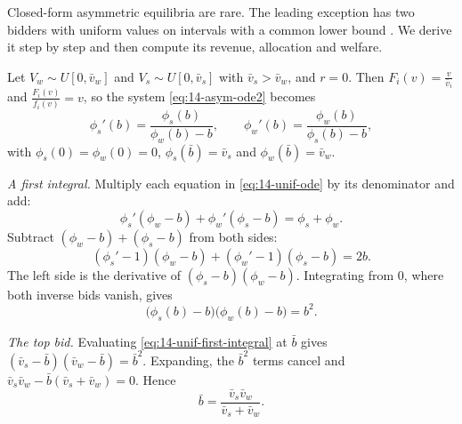Closed-form asymmetric equilibria are rare. The leading exception has two bidders with uniform values
on intervals with a common lower bound
\citep{GriesmerLevitanShubik1967,Plum1992,Krishna2010}. We derive it step by step and then compute
its revenue, allocation and welfare.

\begin{example}\label{ex:14-asym-uniform}
Let $V_w\sim U[0,\bar v_w]$ and $V_s\sim U[0,\bar v_s]$ with $\bar v_s>\bar v_w$, and $r=0$. Then
$F_i(v)=\frac{v}{\bar v_i}$ and $\frac{F_i(v)}{f_i(v)}=v$, so the system \eqref{eq:14-asym-ode2}
becomes
\begin{equation}\label{eq:14-unif-ode}
\phi_s'(b)=\frac{\phi_s(b)}{\phi_w(b)-b},\qquad \phi_w'(b)=\frac{\phi_w(b)}{\phi_s(b)-b},
\end{equation}
with $\phi_s(0)=\phi_w(0)=0$, $\phi_s(\bar b)=\bar v_s$ and $\phi_w(\bar b)=\bar v_w$.

\emph{A first integral.} Multiply each equation in \eqref{eq:14-unif-ode} by its denominator and add:
\[
\phi_s'(\phi_w-b)+\phi_w'(\phi_s-b)=\phi_s+\phi_w .
\]
Subtract $(\phi_w-b)+(\phi_s-b)$ from both sides:
\[
(\phi_s'-1)(\phi_w-b)+(\phi_w'-1)(\phi_s-b)=2b .
\]
The left side is the derivative of $(\phi_s-b)(\phi_w-b)$. Integrating from $0$, where both
inverse bids vanish, gives
\begin{equation}\label{eq:14-unif-first-integral}
\bigl(\phi_s(b)-b\bigr)\bigl(\phi_w(b)-b\bigr)=b^2 .
\end{equation}

\emph{The top bid.} Evaluating \eqref{eq:14-unif-first-integral} at $\bar b$ gives $(\bar v_s-\bar
b)(\bar v_w-\bar b)=\bar b^2$. Expanding, the $\bar b^2$ terms cancel and $\bar v_s\bar v_w-\bar
b(\bar v_s+\bar v_w)=0$. Hence
\begin{equation}\label{eq:14-unif-bbar}
\bar b=\frac{\bar v_s\bar v_w}{\bar v_s+\bar v_w}.
\end{equation}


\end{example}
